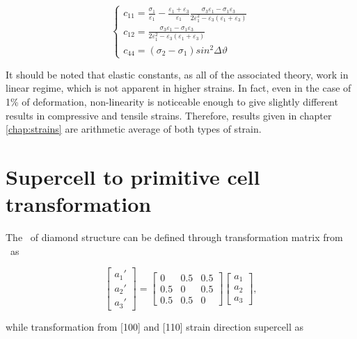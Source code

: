 \begin{equation}
    \label{Eq:elastic}
    \begin{cases}
    c_{11}=\frac{\sigma_1}{\varepsilon_1}-\frac{\varepsilon_1+\varepsilon_3}{\varepsilon_1}\frac{\sigma_3\varepsilon_1-\sigma_1\varepsilon_3}{2\varepsilon_1^2-\varepsilon_3(\varepsilon_1+\varepsilon_3)} \\
    c_{12}=\frac{\sigma_3\varepsilon_1-\sigma_1\varepsilon_3}{2\varepsilon_1^2-\varepsilon_3(\varepsilon_1+\varepsilon_3)} \\
    c_{44}=(\sigma_2-\sigma_1)sin^2\Delta\vartheta
    \end{cases}
\end{equation}

It should be noted that elastic constants, as all of the associated theory, work in linear regime, which is not apparent in higher strains.
In fact, even in the case of 1\% of deformation, non-linearity is noticeable enough to give slightly different results in compressive and tensile strains.
Therefore, results given in chapter \ref{chap:strains} are arithmetic average of both types of strain.

\ornament

\section*{Supercell to primitive cell transformation}
\label{chap:derivations_supercell}
The \prim\ of diamond structure can be defined through transformation matrix from \conv\ as

\begin{equation}
\label{Eq:app_trans_prim}
\begin{bmatrix}
a_1' \\ a_2' \\ a_3'
\end{bmatrix}=
\begin{bmatrix}
0 & 0.5 & 0.5 \\
0.5 & 0 & 0.5 \\
0.5 & 0.5 & 0
\end{bmatrix}
\begin{bmatrix}
a_1 \\ a_2 \\ a_3
\end{bmatrix},
\end{equation}

while transformation from [100] and [110] strain direction supercell as

